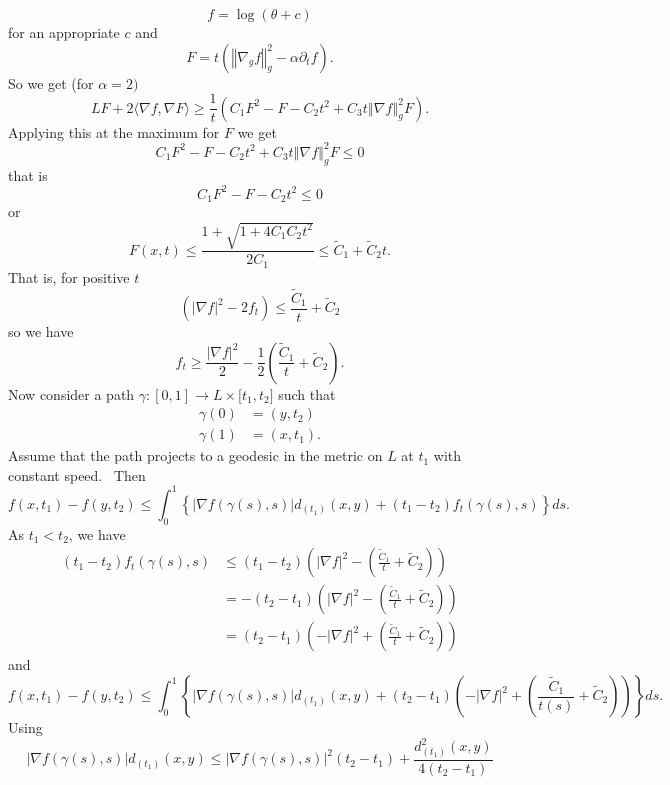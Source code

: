\documentclass[12pt,letterpaper]{amsart}%
\numberwithin{mycounter}{section}
\theoremstyle{plain}
\numberwithin{equation}{section}
\theoremstyle{definition}
\begin{document}
\[
f=\log\left(  \theta+c\right)
\]
for an appropriate $c$ and
\[
F=t\left(  \left\Vert \nabla_{g}f\right\Vert _{g}^{2}-\alpha\partial
_{t}f\right).
\]
So we get (for $\alpha=2)$
\[
LF+2\langle\nabla f,\nabla F\rangle\geq\frac{1}{t}\left(  C_{1}F^{2}%
-F-C_{2}t^{2}+C_{3}t\left\Vert \nabla f\right\Vert _{g}^{2}F\right)  .
\]
Applying this at the maximum for $F$ we get
\[
C_{1}F^{2}-F-C_{2}t^{2}+C_{3}t\left\Vert \nabla f\right\Vert _{g}^{2}F\leq0
\]
that is
\[
C_{1}F^{2}-F-C_{2}t^{2}\leq0
\]
or
\[
F(x,t)\leq\frac{1+\sqrt{1+4C_{1}C_{2}t^{2}}}{2C_{1}}\leq\tilde{C}_{1}%
+\tilde{C}_{2}t.
\]
That is, for positive $t$
\[
\left(  \left\vert \nabla f\right\vert ^{2}-2f_{t}\right)  \leq\frac{\tilde
{C}_{1}}{t}+\tilde{C}_{2}%
\]
so we have
\[
f_{t}\geq\frac{\left\vert \nabla f\right\vert ^{2}}{2}-\frac{1}{2}\left(
\frac{\tilde{C}_{1}}{t}+\tilde{C}_{2}\right).
\]
Now consider a path $\gamma:[0,1]\rightarrow L\times\lbrack t_{1},t_{2}]$ such
that
\begin{align*}
\gamma(0) &  =(y,t_{2})\\
\gamma(1) &  =\left(  x,t_{1}\right).
\end{align*}
Assume that the path projects to a geodesic in the metric on $L$ at $t_{1}$ with
constant speed. \ Then
\[
f(x,t_{1})-f\left(  y,t_{2}\right)  \leq\int_{0}^{1}\left\{  \left\vert \nabla
f(\gamma(s),s)\right\vert d_{(t_{1})}(x,y)+\left(  t_{1}-t_{2}\right)
f_{t}(\gamma(s),s)\right\}  ds.
\]
As $t_{1}<t_{2}$, we have
\begin{align*}
\left(  t_{1}-t_{2}\right)  f_{t}(\gamma(s),s) &  \leq\left(  t_{1}%
-t_{2}\right)  \left(  \left\vert \nabla f\right\vert ^{2}-\left(
\frac{\tilde{C}_{1}}{t}+\tilde{C}_{2}\right)  \right)  \\
&  =-\left(  t_{2}-t_{1}\right)  \left(  \left\vert \nabla f\right\vert
^{2}-\left(  \frac{\tilde{C}_{1}}{t}+\tilde{C}_{2}\right)  \right)  \\
&  =\left(  t_{2}-t_{1}\right)  \left(  -\left\vert \nabla f\right\vert
^{2}+\left(  \frac{\tilde{C}_{1}}{t}+\tilde{C}_{2}\right)  \right)
\end{align*}
and 
\[
f(x,t_{1})-f\left(  y,t_{2}\right)  \leq\int_{0}^{1}\left\{  \left\vert \nabla
f(\gamma(s),s)\right\vert d_{(t_{1})}(x,y)+\left(  t_{2}-t_{1}\right)  \left(
-\left\vert \nabla f\right\vert ^{2}+\left(  \frac{\tilde{C}_{1}}{t(s)}%
+\tilde{C}_{2}\right)  \right)  \right\}  ds.
\]
Using
\[
\left\vert \nabla f(\gamma(s),s)\right\vert d_{(t_{1})}(x,y)\leq\left\vert
\nabla f(\gamma(s),s)\right\vert ^{2}\left(  t_{2}-t_{1}\right)
+\frac{d_{(t_{1})}^{2}(x,y)}{4\left(  t_{2}-t_{1}\right)  }%
\]
\end{document}
